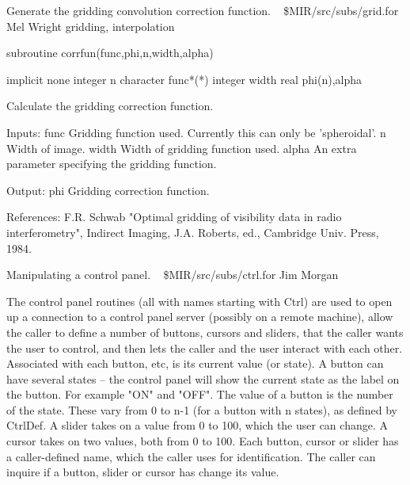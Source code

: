 %
\noindent Generate the gridding convolution correction function.
\newline \ 
\newline {} \$MIR/src/subs/grid.for
\newline {} Mel Wright
\newline {} gridding, interpolation
\par{\tenpoint
{\eightpoint\begintt
        subroutine corrfun(func,phi,n,width,alpha)

        implicit none
        integer n
        character func*(*)
        integer width
        real phi(n),alpha

  Calculate the gridding correction function.

  Inputs:
    func       Gridding function used. Currently this can only be
               'spheroidal'.
    n          Width of image.
    width      Width of gridding function used.
    alpha      An extra parameter specifying the gridding function.

  Output:
    phi        Gridding correction function.

  References:
    F.R. Schwab "Optimal gridding of visibility data in radio interferometry",
      Indirect Imaging, J.A. Roberts, ed., Cambridge Univ. Press, 1984.
\endtt}
\par}
%
\noindent Manipulating a control panel.
\newline \ 
\newline {} \$MIR/src/subs/ctrl.for
\newline {} Jim Morgan
\par{\tenpoint
{\eightpoint\begintt
  The control panel routines (all with names starting with Ctrl) are used
  to open up a connection to a control panel server (possibly on a remote
  machine), allow the caller to define a number of buttons, cursors and
  sliders, that the caller wants the user to control, and then lets the
  caller and the user interact with each other. Associated with each
  button, etc, is its current value (or state).
  A button can have several states -- the control panel will show the current
  state as the label on the button. For example "ON" and "OFF". The value
  of a button is the number of the state. These vary from 0 to n-1 (for
  a button with n states), as defined by CtrlDef.
  A slider takes on a value from 0 to 100, which the user can change.
  A cursor takes on two values, both from 0 to 100.
  Each button, cursor or slider has a caller-defined name, which the caller
  uses for identification. The caller can inquire if a button, slider or
  cursor has change its value.
\endtt}
\par}
